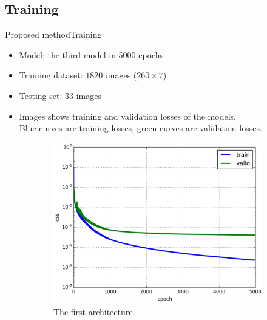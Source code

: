 \documentclass[10pt]{beamer}
\begin{document}
\subsection{Training}
\begin{frame}{Proposed method}{Training}
	\begin{itemize}
		\item Model: the third model in 5000 epochs\footnotemark
		\item Training dataset: $1820$ images ($260 \times 7$)
		\item Testing set: $33$ images
		\item Images shows training and validation losses of the models.\\ \small{{\color{blue}Blue} curves are training losses, {\color{green}green} curves are validation losses.}
	\end{itemize}
	\begin{figure}[htbp]
   				\begin{subfigure}[t]{0.5\textwidth}
        			\centering
        			\includegraphics[scale=.2]{images/loss_model_1}
        			\caption{\scriptsize{The first architecture}}
        			\label{figsub11}
    			\end{subfigure}%
    			~ 
    			\begin{subfigure}[t]{0.5\textwidth}
        			\centering

\end{subfigure}
\end{figure}
\end{frame}
\end{document}
